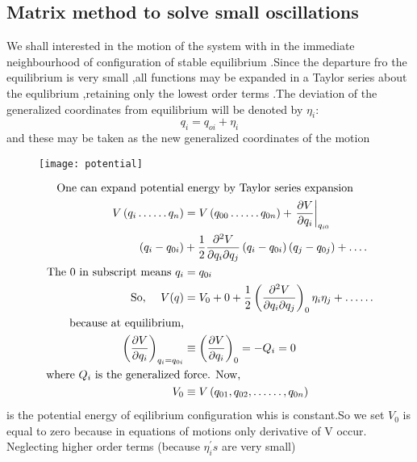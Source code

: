 \subsection{Matrix method to solve small oscillations}
We shall interested in the motion of the system with in the immediate neighbourhood of configuration of stable equilibrium .Since the departure fro the equilibrium is very small ,all functions may be expanded in a Taylor series about the equlibrium ,retaining only the lowest order terms .The deviation of the generalized coordinates from equilibrium will be denoted by $\eta_i$:\\
$$q_i=q_{oi}+\eta_i$$
and these may be taken as the new generalized coordinates of the motion  
\begin{figure}[H]
	\centering
	\texttt{[image: potential]}
	\caption{}
	\label{}
\end{figure}
\begin{align}
\text{One can expand potential}&\text{ energy by Taylor series expansion}\notag\\
V\left(q_{i} \ldots \ldots q_{n}\right)&=V\left(q_{00} \ldots \ldots q_{0 n}\right)+\left.\frac{\partial V}{\partial q_{i}}\right|_{q_{i 0}}\notag\\
\left(q_{i}-q_{0 i}\right)&+\frac{1}{2} \frac{\partial^{2} V}{\partial q_{i} \partial q_{j}}\left(q_{i}-q_{0 i}\right)\left(q_{j}-q_{0 j}\right)+\ldots .\notag\\
\text{The 0 in subscript }\text{means }q_{i}&=q_{0 i}\notag\\
\text{So, }\quad V(q)&=V_{0}+0+\frac{1}{2}\left(\frac{\partial^{2} V}{\partial q_{i} \partial q_{j}}\right)_{0} \eta_{i} \eta_{j}+\ldots \ldots \label{ref1}\\
\text{because at }\text{equilibrium,}&\notag\\
\left(\frac{\partial V}{\partial q_{i}}\right)_{q_{i}=q_{0 i}} &\equiv\left(\frac{\partial V}{\partial q_{i}}\right)_{0}=-Q_{i}=0\notag\\
\text{where $Q_{i}$ is the }\text{generalized }&\text{force. Now,}\\
V_{0} &\equiv V\left(q_{01}, q_{02}, \ldots \ldots, q_{0 n}\right) \label{ref2}
\end{align}
 is the potential energy of eqilibrium configuration whis is constant.So we set $V_0$ is equal to zero because in equations of motions only derivative of V occur.\\
 Neglecting higher order terms (because $\eta_{i}^{\prime} s$ are very small)
